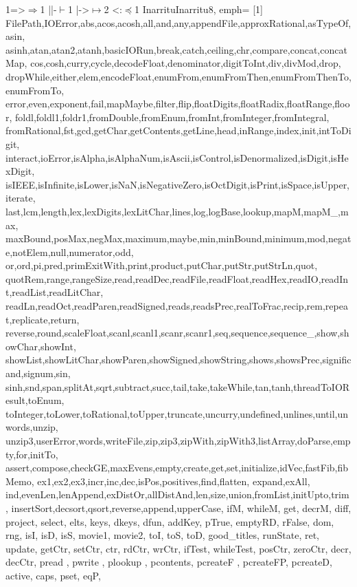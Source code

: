 {{           {1=>}{{$\Rightarrow$}}1
           {||-}{{$\vdash$}}1
           {|->}{{$\mapsto$}}2
           {<:}{{$\preceq$}}1
           {Inarritu}{Inarritu}8},
	emph=
	{[1]
		FilePath,IOError,abs,acos,acosh,all,and,any,appendFile,approxRational,asTypeOf,asin,
		asinh,atan,atan2,atanh,basicIORun,break,catch,ceiling,chr,compare,concat,concatMap,
		cos,cosh,curry,cycle,decodeFloat,denominator,digitToInt,div,divMod,drop,
		dropWhile,either,elem,encodeFloat,enumFrom,enumFromThen,enumFromThenTo,enumFromTo,
		error,even,exponent,fail,mapMaybe,filter,flip,floatDigits,floatRadix,floatRange,floor,
		foldl,foldl1,foldr1,fromDouble,fromEnum,fromInt,fromInteger,fromIntegral,
		fromRational,fst,gcd,getChar,getContents,getLine,head,inRange,index,init,intToDigit,
		interact,ioError,isAlpha,isAlphaNum,isAscii,isControl,isDenormalized,isDigit,isHexDigit,
		isIEEE,isInfinite,isLower,isNaN,isNegativeZero,isOctDigit,isPrint,isSpace,isUpper,iterate,
		last,lcm,length,lex,lexDigits,lexLitChar,lines,log,logBase,lookup,mapM,mapM_,max,
		maxBound,posMax,negMax,maximum,maybe,min,minBound,minimum,mod,negate,notElem,null,numerator,odd,
		or,ord,pi,pred,primExitWith,print,product,putChar,putStr,putStrLn,quot,
		quotRem,range,rangeSize,read,readDec,readFile,readFloat,readHex,readIO,readInt,readList,readLitChar,
		readLn,readOct,readParen,readSigned,reads,readsPrec,realToFrac,recip,rem,repeat,replicate,return,
		reverse,round,scaleFloat,scanl,scanl1,scanr,scanr1,seq,sequence,sequence_,show,showChar,showInt,
		showList,showLitChar,showParen,showSigned,showString,shows,showsPrec,significand,signum,sin,
		sinh,snd,span,splitAt,sqrt,subtract,succ,tail,take,takeWhile,tan,tanh,threadToIOResult,toEnum,
		toInteger,toLower,toRational,toUpper,truncate,uncurry,undefined,unlines,until,unwords,unzip,
		unzip3,userError,words,writeFile,zip,zip3,zipWith,zipWith3,listArray,doParse,empty,for,initTo,
        assert,compose,checkGE,maxEvens,empty,create,get,set,initialize,idVec,fastFib,fibMemo,
        ex1,ex2,ex3,incr,inc,dec,isPos,positives,find,flatten, expand,exAll,
				ind,evenLen,lenAppend,exDistOr,allDistAnd,len,size,union,fromList,initUpto,trim,
        insertSort,decsort,qsort,reverse,append,upperCase, ifM, whileM, get, decrM, diff,
        project, select, elts, keys, dkeys, dfun, addKey, pTrue, emptyRD, rFalse,
                dom, rng, isI, isD, isS, movie1, movie2,  toI, toS, toD, good_titles, runState, ret,
                update, getCtr, setCtr, ctr, rdCtr, wrCtr, ifTest, whileTest, posCtr, zeroCtr, decr, decCtr,
                pread , pwrite , plookup , pcontents, pcreateF , pcreateFP, pcreateD, active, caps, pset, eqP,
}}
